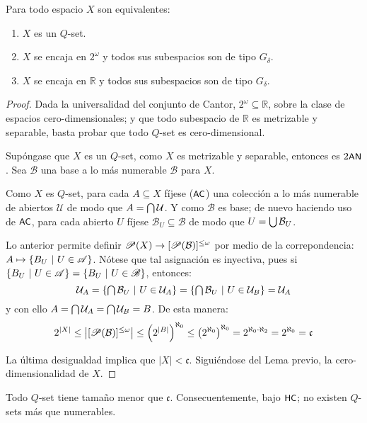     \begin{proposicion}\label{prop-QsetEquivs}
        Para todo espacio $X$ son equivalentes:
        \begin{enumerate}
            \item $X$ es un $Q$-set.
            \item $X$ se encaja en $2^\omega$ y todos sus subespacios son de tipo $G_\delta$.
            \item $X$ se encaja en $\mathbb{R}$ y todos sus subespacios son de tipo $G_\delta$.
        \end{enumerate}
    \end{proposicion}
    \begin{proof}
        Dada la universalidad del conjunto de Cantor, $2^\omega \subseteq \mathbb{R}$, sobre la clase de espacios cero-dimensionales; y que todo subespacio de $\mathbb{R}$ es metrizable y separable, basta probar que todo $Q$-set es cero-dimensional.

        Supóngase que $X$ es un $Q$-set, como $X$ es metrizable y separable, entonces es $2\text{\textsf{\small AN}}$. Sea $\mathcal{B}$ una base a lo más numerable $\mathcal{B}$ para $X$.

        Como $X$ es $Q$-set, para cada $A \subseteq X$ fíjese ($\text{\textsf{\small AC}}$) una colección a lo más numerable de abiertos $\mathcal{U}$ de modo que $A=\mbox{$\bigcap$}\, \mathcal{U}$. Y como $\mathcal{B}$ es base; de nuevo haciendo uso de $\text{\textsf{\small AC}}$, para cada abierto $U$ fíjese $\mathcal{B}_U \subseteq \mathcal{B}$ de modo que $U=\mbox{$\bigcup$}\, \mathcal{B}_U$.

        Lo anterior permite definir $\mathscr{P}(X) \to [\mathscr{P}(\mathcal{B})]^{\leq \omega}$ por medio de la correpondencia: $A \mapsto \{B_U \text{ $|$ } U \in \mathscr{A}\}$. Nótese que tal asignación es inyectiva, pues si $\{B_U \text{ $|$ } U \in \mathscr{A}\}=\{B_U \text{ $|$ } U \in \mathscr{B}\}$, entonces:
        \[ \mathcal{U}_A = \{\mbox{$\bigcap$}\, \mathcal{B}_U \text{ $|$ } U \in \mathcal{U}_A\} = \{\mbox{$\bigcap$}\, \mathcal{B}_U \text{ $|$ } U \in \mathcal{U}_B\} = \mathcal{U}_A \]
        y con ello $A=\mbox{$\bigcap$}\, \mathcal{U}_A = \mbox{$\bigcap$}\, \mathcal{U}_B = B$. De esta manera:
        \[ 2^{|X|} \leq \left| [\mathscr{P}(\mathcal{B})]^{\leq \omega} \right| \leq \left( 2^{|B|} \right)^{\aleph_0} \leq \left( 2^{\aleph_0} \right) ^{\aleph_0} = 2^{\aleph_0 \cdot \aleph_2} = 2^{\aleph_0} = \mathfrak{c} \]

        La última desigualdad implica que $|X| < \mathfrak{c}$. Siguiéndose del Lema previo, la cero-dimensionalidad de $X$.
    \end{proof}

    \begin{observacion}\label{obs-HCNoQset}
        Todo $Q$-set tiene tamaño menor que $\mathfrak{c}$. Consecuentemente, bajo $\text{\textsf{\small HC}}$; no existen $Q$-sets más que numerables.
    \end{observacion}

